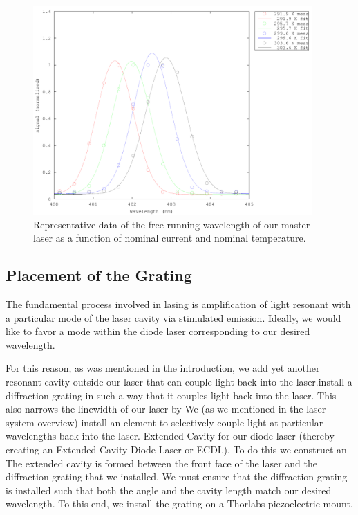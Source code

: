 \begin{figure}
\centering
\includegraphics[width=0.95\textwidth]{temperatureFit} 
\caption[Graph of Temperatures and Currents]{\label{3dCurrentandTgraph} Representative data of the free-running wavelength of our master laser as a function of nominal current and nominal temperature.}
\end{figure}

\subsection{Placement of the Grating}



The fundamental process involved in lasing is amplification of light resonant with a particular mode of the laser cavity via stimulated emission. Ideally, we would like to favor a mode within the diode laser corresponding to our desired wavelength. 

For this reason, as was mentioned in the introduction, we add yet another resonant cavity outside our laser that can couple light back into the laser.install a diffraction grating in such a way that it couples light back into the laser. This also narrows the linewidth of our laser by  We (as we mentioned in the laser system overview) install an element to selectively couple light at particular wavelengths back into the laser. 
 Extended Cavity for our diode laser (thereby creating an Extended Cavity Diode Laser or ECDL).
To do this we construct an The extended cavity is formed between the front face of the laser and the diffraction grating that we installed. We must ensure that the diffraction grating is installed such that both the angle and the cavity length match our desired wavelength. To this end, we install the grating on a Thorlabs piezoelectric mount.

